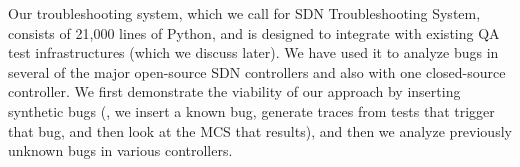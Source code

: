 Our troubleshooting system, which we call {\projectname} for SDN Troubleshooting System, consists of 21,000 lines of Python, and is designed to integrate with existing QA test infrastructures (which we discuss later). We have used it to analyze bugs in several of the major open-source SDN controllers and also with one closed-source controller. We first demonstrate the viability of our approach by inserting synthetic bugs (\ie, we insert a known bug, generate traces from tests that trigger that bug, and then look at the MCS that results), and then we analyze previously unknown bugs in various controllers.
